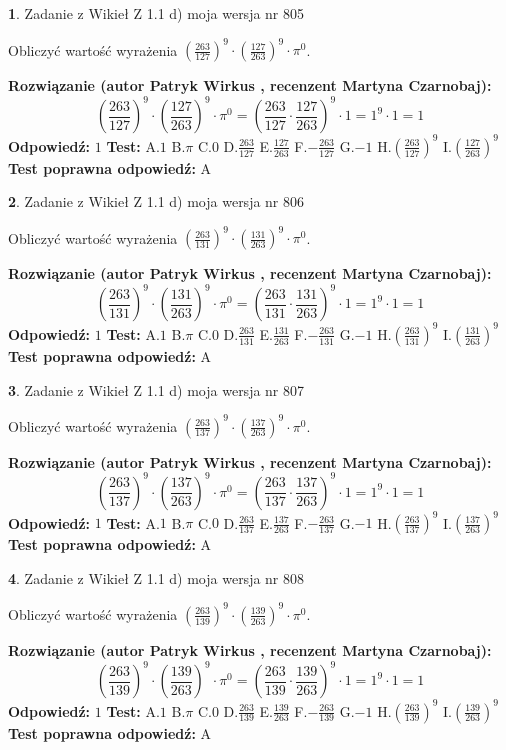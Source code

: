 \documentclass[12pt, a4paper]{article}
\theoremstyle{definition} %
\newtheorem{zad}{}
\newcommand{\zadStart}[1]{\begin{zad}#1\newline}
\newcommand{\zadStop}{\end{zad}}
\newcommand{\rozwStart}[2]{\noindent \textbf{Rozwiązanie (autor #1 , recenzent #2): }\newline}
\newcommand{\rozwStop}{\newline}
\newcommand{\odpStart}{\noindent \textbf{Odpowiedź:}\newline}
\newcommand{\odpStop}{\newline}
\newcommand{\testStart}{\noindent \textbf{Test:}\newline}
\newcommand{\testStop}{\newline}
\newcommand{\kluczStart}{\noindent \textbf{Test poprawna odpowiedź:}\newline}
\newcommand{\kluczStop}{\newline}
\begin{document}
\zadStart{Zadanie z Wikieł Z 1.1 d) moja wersja nr 805}

Obliczyć wartość wyrażenia $(\frac{263}{127})^{9} \cdot (\frac{127}{263})^{9} \cdot \pi^{0}$.
\zadStop
\rozwStart{Patryk Wirkus}{Martyna Czarnobaj}
$$(\frac{263}{127})^{9} \cdot (\frac{127}{263})^{9} \cdot \pi^{0} = (\frac{263}{127} \cdot \frac{127}{263})^{9} \cdot 1 = 1^{9} \cdot 1 = 1$$
\rozwStop
\odpStart
$1$
\odpStop
\testStart
A.$1$ B.$\pi$ C.$0$ D.$\frac{263}{127}$ E.$\frac{127}{263}$
F.$-\frac{263}{127}$ G.$-1$
H.$(\frac{263}{127})^{9}$
I.$(\frac{127}{263})^{9}$
\testStop
\kluczStart
A
\kluczStop



\zadStart{Zadanie z Wikieł Z 1.1 d) moja wersja nr 806}

Obliczyć wartość wyrażenia $(\frac{263}{131})^{9} \cdot (\frac{131}{263})^{9} \cdot \pi^{0}$.
\zadStop
\rozwStart{Patryk Wirkus}{Martyna Czarnobaj}
$$(\frac{263}{131})^{9} \cdot (\frac{131}{263})^{9} \cdot \pi^{0} = (\frac{263}{131} \cdot \frac{131}{263})^{9} \cdot 1 = 1^{9} \cdot 1 = 1$$
\rozwStop
\odpStart
$1$
\odpStop
\testStart
A.$1$ B.$\pi$ C.$0$ D.$\frac{263}{131}$ E.$\frac{131}{263}$
F.$-\frac{263}{131}$ G.$-1$
H.$(\frac{263}{131})^{9}$
I.$(\frac{131}{263})^{9}$
\testStop
\kluczStart
A
\kluczStop



\zadStart{Zadanie z Wikieł Z 1.1 d) moja wersja nr 807}

Obliczyć wartość wyrażenia $(\frac{263}{137})^{9} \cdot (\frac{137}{263})^{9} \cdot \pi^{0}$.
\zadStop
\rozwStart{Patryk Wirkus}{Martyna Czarnobaj}
$$(\frac{263}{137})^{9} \cdot (\frac{137}{263})^{9} \cdot \pi^{0} = (\frac{263}{137} \cdot \frac{137}{263})^{9} \cdot 1 = 1^{9} \cdot 1 = 1$$
\rozwStop
\odpStart
$1$
\odpStop
\testStart
A.$1$ B.$\pi$ C.$0$ D.$\frac{263}{137}$ E.$\frac{137}{263}$
F.$-\frac{263}{137}$ G.$-1$
H.$(\frac{263}{137})^{9}$
I.$(\frac{137}{263})^{9}$
\testStop
\kluczStart
A
\kluczStop



\zadStart{Zadanie z Wikieł Z 1.1 d) moja wersja nr 808}

Obliczyć wartość wyrażenia $(\frac{263}{139})^{9} \cdot (\frac{139}{263})^{9} \cdot \pi^{0}$.
\zadStop
\rozwStart{Patryk Wirkus}{Martyna Czarnobaj}
$$(\frac{263}{139})^{9} \cdot (\frac{139}{263})^{9} \cdot \pi^{0} = (\frac{263}{139} \cdot \frac{139}{263})^{9} \cdot 1 = 1^{9} \cdot 1 = 1$$
\rozwStop
\odpStart
$1$
\odpStop
\testStart
A.$1$ B.$\pi$ C.$0$ D.$\frac{263}{139}$ E.$\frac{139}{263}$
F.$-\frac{263}{139}$ G.$-1$
H.$(\frac{263}{139})^{9}$
I.$(\frac{139}{263})^{9}$
\testStop
\kluczStart
A
\kluczStop
\end{document}
